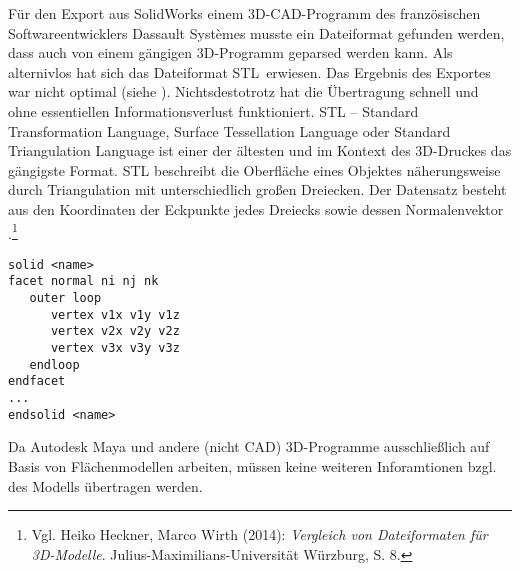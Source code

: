 Für den Export aus SolidWorks einem 3D-CAD-Programm des französischen Softwareentwicklers Dassault Systèmes musste ein Dateiformat gefunden werden, dass auch von einem gängigen 3D-Programm geparsed werden kann. Als alternivlos hat sich das Dateiformat \glqq STL\grqq\, erwiesen. Das Ergebnis des Exportes war nicht optimal (siehe ). Nichtsdestotrotz hat die Übertragung schnell und ohne essentiellen Informationsverlust funktioniert.
STL -- Standard Transformation Language,  Surface Tessellation Language oder Standard Triangulation Language ist einer der ältesten und im Kontext des 3D-Druckes das gängigste Format.  
STL beschreibt die Oberfläche eines Objektes näherungsweise durch Triangulation mit unterschiedlich großen Dreiecken. Der Datensatz besteht aus den Koordinaten der Eckpunkte jedes Dreiecks sowie dessen Normalenvektor .\footnote{Vgl. Heiko Heckner, Marco Wirth (2014): \textit{Vergleich von Dateiformaten für 3D-Modelle}. Julius-Maximilians-Universität Würzburg, S. 8.}


\begin{lstlisting}[caption={STL ASCII Schema.}, captionpos=b, label={lst:STL ASCII}]
solid <name>
facet normal ni nj nk
   outer loop
      vertex v1x v1y v1z
      vertex v2x v2y v2z
      vertex v3x v3y v3z
   endloop
endfacet
...
endsolid <name>

\end{lstlisting}

Da Autodesk Maya und andere (nicht CAD) 3D-Programme ausschließlich auf Basis von Flächenmodellen arbeiten, müssen keine weiteren Inforamtionen bzgl. des Modells übertragen werden.
